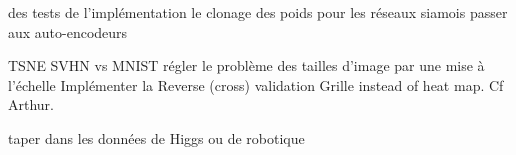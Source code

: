 
\TODO des tests de l'implémentation
\TODO le clonage des poids pour les réseaux siamois
\TODO passer aux auto-encodeurs

\TODO TSNE
\TODO SVHN vs MNIST régler le problème des tailles d'image par une 
mise à l'échelle
\TODO Implémenter la Reverse (cross) validation
\TODO Grille instead of heat map. Cf Arthur.

\TODO taper dans les données de Higgs ou de robotique
